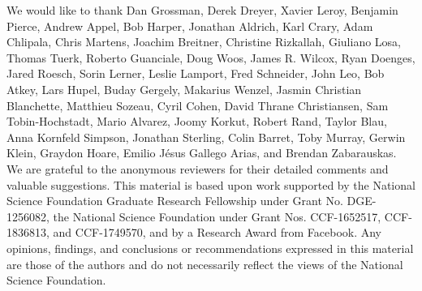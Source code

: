 \begin{acknowledgements}
We would like to thank Dan Grossman, Derek Dreyer, Xavier Leroy, Benjamin Pierce, Andrew Appel, Bob Harper, Jonathan Aldrich, Karl Crary, Adam Chlipala, Chris Martens, Joachim Breitner, Christine Rizkallah, Giuliano Losa, Thomas Tuerk, Roberto Guanciale, Doug Woos, James R. Wilcox, Ryan Doenges, Jared Roesch, Sorin Lerner, Leslie Lamport, Fred Schneider, John Leo, Bob Atkey, Lars Hupel, Buday Gergely, Makarius Wenzel, Jasmin Christian Blanchette, Matthieu Sozeau, Cyril Cohen, David Thrane Christiansen, Sam Tobin-Hochstadt, Mario Alvarez, Joomy Korkut, Robert Rand,
Taylor Blau, Anna Kornfeld Simpson, Jonathan Sterling, Colin Barret,
Toby Murray, Gerwin Klein, Graydon Hoare, Emilio J\'esus Gallego Arias, and Brendan Zabarauskas.
We are grateful to the anonymous reviewers for their detailed comments and valuable suggestions.
This material is based upon work supported by the National Science Foundation Graduate Research Fellowship under Grant No. DGE-1256082, the National Science Foundation under Grant Nos. CCF-1652517, CCF-1836813, and CCF-1749570, and by a Research Award from Facebook.
Any opinions, findings, and conclusions or recommendations expressed in this material are those of the 
authors and do not necessarily reflect the views of the National Science Foundation.
\end{acknowledgements}


